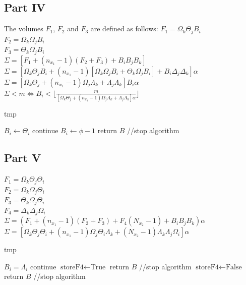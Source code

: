 \documentclass[conference]{IEEEtran}
\begin{document}
  \subsection{Part IV}
  The volumes $F_1$, $F_2$ and $F_3$ are defined as follows:
  \noindent $F_1 = \Omega_k \Theta_j B_i$ \\
  $F_2 = \Omega_k \Omega_j B_i$ \\
  $F_3 = \Theta_k \Omega_j B_i$ \\

  \noindent $\Sigma = [ F_1 + (n_{x_1} - 1)(F_2 + F_3) + B_iB_jB_k ]$ \\
  $\Sigma = [\Omega_k\Theta_jB_i + (n_{x_1} - 1)[\Omega_k\Omega_jB_i + \Theta_k\Omega_jB_i] + B_i\Delta_j\Delta_k]\alpha$ \\
  $\Sigma = [\Omega_k\Theta_j + (n_{x_1}-1)\Omega_j\Lambda_k + \Lambda_j\Lambda_k]B_i\alpha$ \\
  $\Sigma < m \Leftrightarrow B_i < \lfloor \frac{m}{[\Omega_k\Theta_j + (n_{x_1}-1)\Omega_j\Lambda_k + \Lambda_j\Lambda_k]\alpha} \rfloor$

  \begin{algorithm}[h]
    \caption{tmp}
    \begin{algorithmic}[1]
      \STATE $B_i \leftarrow \Theta_i$
      \STATE continue
    \ELSE
      \STATE $B_i \leftarrow \phi - 1$
      \STATE return $B$ //stop algorithm
    \ENDIF
    \end{algorithmic}
  \end{algorithm}

  \subsection{Part V}
  \noindent $F_1 = \Omega_k \Theta_j \Theta_i$ \\
  $F_2 = \Omega_k \Omega_j \Theta_i$ \\
  $F_3 = \Theta_k \Omega_j \Theta_i$ \\
  $F_4 = \Delta_k \Delta_j \Omega_i$ \\

  \noindent $\Sigma = (F_1 + (n_{x_1}-1)(F_2 + F_3) + F_4(N_{x_2}-1) + B_iB_jB_k)\alpha$ \\
  $\Sigma = [\Omega_k\Theta_j\Theta_i + (n_{x_1}-1)\Omega_j\Theta_i\Lambda_k + (N_{x_2}-1)\Lambda_k\Lambda_j\Omega_i]\alpha$

  \begin{algorithm}[h]
    \caption{tmp}
    \begin{algorithmic}[1]
    \STATE $B_i = \Lambda_i$
      \STATE continue
      \STATE $\textrm{storeF4} \leftarrow \textrm{True}$
      \STATE return $B$ //stop algorithm
    \ELSE
      \STATE $\textrm{storeF4} \leftarrow \textrm{False}$
      \STATE return $B$ //stop algorithm
    \ENDIF
    \end{algorithmic}
  \end{algorithm}
\end{document}
